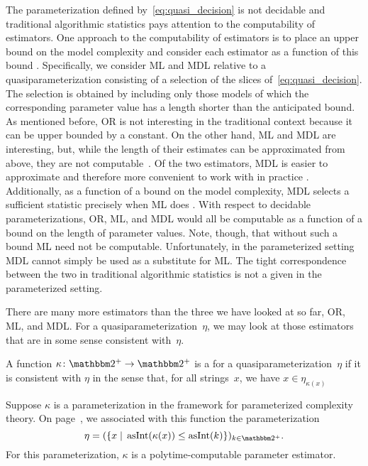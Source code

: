 The parameterization defined by~\eqref{eq:quasi_decision} is not decidable and traditional algorithmic statistics pays attention to the computability of estimators.
One approach to the computability of estimators is to place an upper bound on the model complexity and consider each estimator as a function of this bound \parencite{gacs2001algorithmic,vereshchagin2004kolmogorov} \parencite[in the presence of resource bounds,][]{milovanov2017algorithmic}.
Specifically, we consider ML and MDL relative to a quasiparameterization consisting of a selection of the slices of~\eqref{eq:quasi_decision}.
The selection is obtained by including only those models of which the corresponding parameter value has a length shorter than the anticipated bound.
As mentioned before, OR is not interesting in the traditional context because it can be upper bounded by a constant.
On the other hand, ML and MDL are interesting, but, while the length of their estimates can be approximated from above, they are not computable~\parencite{vereshchagin2004kolmogorov}.
Of the two estimators, MDL is easier to approximate and therefore more convenient to work with in practice \parencite[][Section~V.B]{vereshchagin2004kolmogorov}.
Additionally, as a function of a bound on the model complexity, MDL selects a sufficient statistic precisely when ML does \parencite[][Lemma~IV.2]{vereshchagin2004kolmogorov}.
With respect to decidable parameterizations, OR, ML, and MDL would all be computable as a function of a bound on the length of parameter values.
Note, though, that without such a bound ML need not be computable.
Unfortunately, in the parameterized setting MDL cannot simply be used as a substitute for ML.
The tight correspondence between the two in traditional algorithmic statistics is not a given in the parameterized setting.

There are many more estimators than the three we have looked at so far, OR, ML, and MDL.
For a quasiparameterization~$\eta$, we may look at those estimators that are in some sense consistent with~$\eta$.
\begin{definition}
  A function $\kappa\colon \binary^+ \to \binary^+$ is a  for a quasiparameterization~$\eta$ if it is consistent with $\eta$ in the sense that, for all strings~$x$, we have $x \in \eta_{\kappa(x)}$
\end{definition}
\begin{example}
  Suppose $\kappa$ is a parameterization in the \citeauthor{flum2006parameterized} framework for parameterized complexity theory.
  On page~\pageref{eq:flum_parameterization}, we associated with this function the parameterization
  \begin{equation*}
    \eta \deq (\{x \st \asNat(\kappa(x)) \le \asNat(k)\})_{k \in \binary^+}.
  \end{equation*}
  For this parameterization, $\kappa$ is a polytime-computable parameter estimator.
\end{example}

